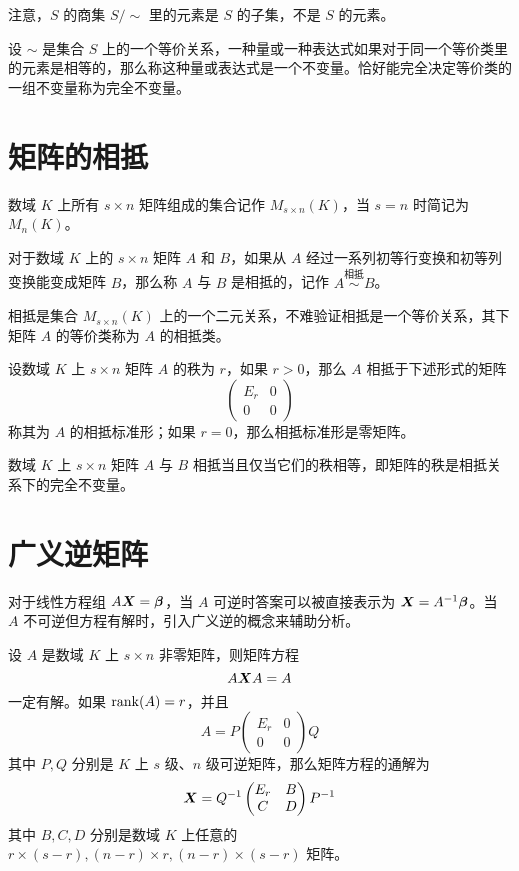 注意，$S$ 的商集 $S/\sim$ 里的元素是 $S$ 的子集，不是 $S$ 的元素。

设 $\sim$ 是集合 $S$ 上的一个等价关系，一种量或一种表达式如果对于同一个等价类里的元素是相等的，那么称这种量或表达式是一个不变量。恰好能完全决定等价类的一组不变量称为完全不变量。

\section{矩阵的相抵}

数域 $K$ 上所有 $s\times n$ 矩阵组成的集合记作 $M_{s\times n}(K)$，当 $s=n$ 时简记为 $M_n(K)$。

\begin{definition}
	对于数域 $K$ 上的 $s\times n$ 矩阵 $A$ 和 $B$，如果从 $A$ 经过一系列初等行变换和初等列变换能变成矩阵 $B$，那么称 $A$ 与 $B$ 是相抵的，记作 $A\overset{\text{相抵}}{\sim}B$。
\end{definition}

相抵是集合 $M_{s\times n}(K)$ 上的一个二元关系，不难验证相抵是一个等价关系，其下矩阵 $A$ 的等价类称为 $A$ 的相抵类。

\begin{theorem}
	设数域 $K$ 上 $s\times n$ 矩阵 $A$ 的秩为 $r$，如果 $r>0$，那么 $A$ 相抵于下述形式的矩阵
	\[\left(\begin{matrix}
				E_r & 0  \\
				0   & 0
			\end{matrix}\right)\]
	称其为 $A$ 的相抵标准形；如果 $r=0$，那么相抵标准形是零矩阵。
\end{theorem}

\begin{theorem}
	数域 $K$ 上 $s\times n$ 矩阵 $A$ 与 $B$ 相抵当且仅当它们的秩相等，即矩阵的秩是相抵关系下的完全不变量。
\end{theorem}

\section{广义逆矩阵}

对于线性方程组 $A\boldsymbol{X} = \boldsymbol{\beta}$，当 $A$ 可逆时答案可以被直接表示为 $\boldsymbol{X} = A^{-1}\boldsymbol{\beta}$。当 $A$ 不可逆但方程有解时，引入广义逆的概念来辅助分析。

\begin{theorem}
	设 $A$ 是数域 $K$ 上 $s\times n$ 非零矩阵，则矩阵方程
	\[ A \boldsymbol{X} A = A \]
	一定有解。如果 $\operatorname{rank}(A) = r$，并且
	\[ A = P\left(\begin{matrix}
				E_r & 0 \\ 0   & 0
			\end{matrix}\right)Q \]
	其中 $P,Q$ 分别是 $K$ 上 $s$ 级、$n$ 级可逆矩阵，那么矩阵方程的通解为
	\[ \boldsymbol{X} = Q^{-1}\left(\begin{matrix}
				E_r & B \\ C   & D
			\end{matrix}\right)P^{-1} \]
	其中 $B,C,D$ 分别是数域 $K$ 上任意的 $r\times (s-r),(n-r)\times r,(n-r)\times (s-r)$ 矩阵。
\end{theorem}

